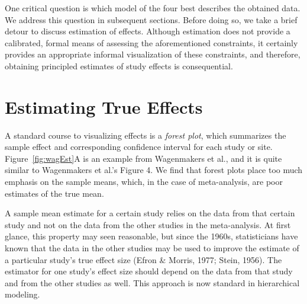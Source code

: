 \documentclass[english,man]{apa6}
\theoremstyle{definition}
\theoremstyle{definition}
\theoremstyle{definition}
\theoremstyle{remark}
\begin{document}
One critical question is which model of the four best describes the
obtained data. We address this question in subsequent sections. Before
doing so, we take a brief detour to discuss estimation of effects.
Although estimation does not provide a calibrated, formal means of
assessing the aforementioned constraints, it certainly provides an
appropriate informal visualization of these constraints, and therefore,
obtaining principled estimates of study effects is consequential.

\section{Estimating True Effects}\label{estimating-true-effects}

A standard course to visualizing effects is a \emph{forest plot}, which
summarizes the sample effect and corresponding confidence interval for
each study or site. Figure~\ref{fig:wagEst}A is an example from
Wagenmakers et al., and it is quite similar to Wagenmakers et al.'s
Figure 4. We find that forest plots place too much emphasis on the
sample means, which, in the case of meta-analysis, are poor estimates of
the true mean.

A sample mean estimate for a certain study relies on the data from that
certain study and not on the data from the other studies in the
meta-analysis. At first glance, this property may seen reasonable, but
since the 1960s, statisticians have known that the data in the other
studies may be used to improve the estimate of a particular study's true
effect size (Efron \& Morris, 1977; Stein, 1956). The estimator for one
study's effect size should depend on the data from that study and from
the other studies as well. This approach is now standard in hierarchical
modeling.
\end{document}

